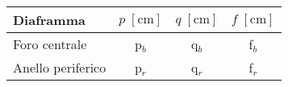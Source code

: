 \begin{table}[H]
    \centering
    \small
    \begin{tabular}{l c c c}
        \toprule
        Diaframma & $p \; [\si{\centi\metre}]$ & $q \; [\si{\centi\metre}]$ & $f \; [\si{\centi\metre}]$ \\
        \midrule
		Foro centrale & p$_b$ & q$_b$ & f$_b$ \\
		Anello periferico & p$_r$ & q$_r$ & f$_r$ \\
        \bottomrule
    \end{tabular}
\end{table}
